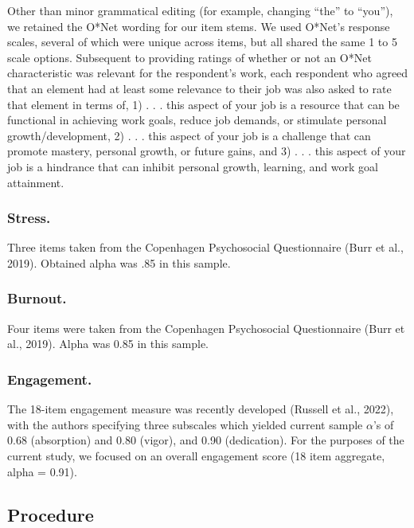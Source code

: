 \documentclass[
  man]{apa6}
\begin{document}
Other than minor grammatical editing (for example, changing ``the'' to ``you''), we retained the O*Net wording for our item stems. We used O*Net's response scales, several of which were unique across items, but all shared the same 1 to 5 scale options. Subsequent to providing ratings of whether or not an O*Net characteristic was relevant for the respondent's work, each respondent who agreed that an element had at least some relevance to their job was also asked to rate that element in terms of, 1) . . . this aspect of your job is a resource that can be functional in achieving work goals, reduce job demands, or stimulate personal growth/development, 2) . . . this aspect of your job is a challenge that can promote mastery, personal growth, or future gains, and 3) . . . this aspect of your job is a hindrance that can inhibit personal growth, learning, and work goal attainment.

\hypertarget{stress.}{%
\subsubsection{Stress.}\label{stress.}}

Three items taken from the Copenhagen Psychosocial Questionnaire (Burr et al., 2019). Obtained alpha was .85 in this sample.

\hypertarget{burnout.}{%
\subsubsection{Burnout.}\label{burnout.}}

Four items were taken from the Copenhagen Psychosocial Questionnaire (Burr et al., 2019). Alpha was 0.85 in this sample.

\hypertarget{engagement.}{%
\subsubsection{Engagement.}\label{engagement.}}

The 18-item engagement measure was recently developed (Russell et al., 2022), with the authors specifying three subscales which yielded current sample \(\alpha\)'s of 0.68 (absorption) and 0.80 (vigor), and 0.90 (dedication). For the purposes of the current study, we focused on an overall engagement score (18 item aggregate, alpha = 0.91).

\hypertarget{procedure}{%
\subsection{Procedure}\label{procedure}}
\end{document}
